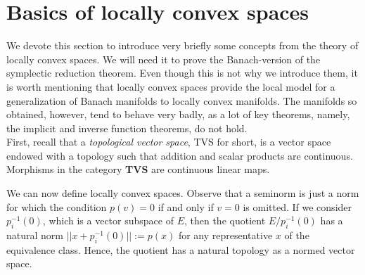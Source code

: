 \section{Basics of locally convex spaces}
We devote this section to introduce very briefly some concepts from the theory of locally convex spaces. We will need it to prove the Banach-version of the symplectic reduction theorem. Even though this is not why we introduce them, it is worth mentioning that locally convex spaces provide the local model for a generalization of Banach manifolds to locally convex manifolds. The manifolds so obtained, however, tend to behave very badly, as a lot of key theorems, namely, the implicit and inverse function theorems, do not hold. \\

First, recall that a \textit{topological vector space}, TVS for short, is a vector space endowed with a topology such that addition and scalar products are continuous. Morphisms in the category \textbf{TVS} are continuous linear maps.

\Definition{\textbf{Seminorm}}{Let \(V\) be a TVS, a \textit{seminorm}\index{Seminorm} is a map \(p \colon V \to [0, \infty)\) satisfying
\begin{enumerate}
    \item \(p(\lambda v)=|\lambda| \cdot p(v)\) for every \(\lambda\in \R, v \in V\).
    \item \(p(v+w) \leq p(v)+p(w)\) for all \(v,w \in V\).
\end{enumerate}
}
We can now define locally convex spaces. Observe that a seminorm is just a norm for which the condition \(p(v)=0\) if and only if \(v=0\) is omitted. If we consider \(p_i^{-1}(0)\), which is a vector subspace of \(E\), then the quotient \(E/p_i^{-1}(0)\) has a natural norm \(||x+p_i^{-1}(0)||:=p(x)\) for any representative \(x\) of the equivalence class. Hence, the quotient has a natural topology as a normed vector space.

